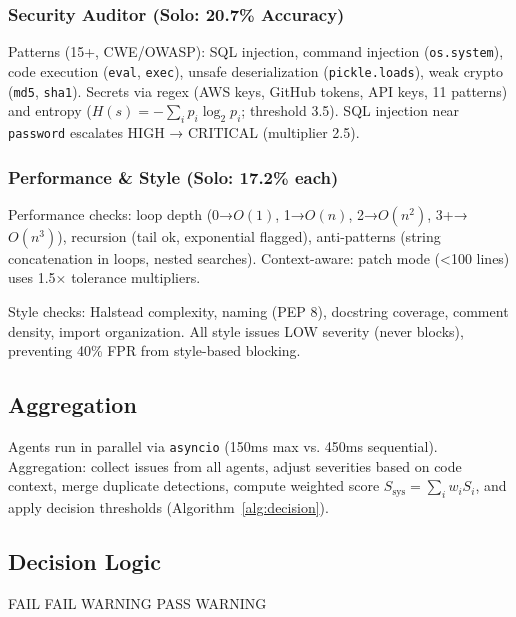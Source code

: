 \documentclass[10pt,twocolumn]{article}
\begin{document}
\subsubsection{Security Auditor (Solo: 20.7\% Accuracy)}

Patterns (15+, CWE/OWASP): SQL injection, command injection (\texttt{os.system}), code execution (\texttt{eval}, \texttt{exec}), unsafe deserialization (\texttt{pickle.loads}), weak crypto (\texttt{md5}, \texttt{sha1}). Secrets via regex (AWS keys, GitHub tokens, API keys, 11 patterns) and entropy ($H(s) = -\sum_i p_i \log_2 p_i$; threshold 3.5). SQL injection near \texttt{password} escalates HIGH → CRITICAL (multiplier 2.5).

\subsubsection{Performance \& Style (Solo: 17.2\% each)}

Performance checks: loop depth (0→$O(1)$, 1→$O(n)$, 2→$O(n^2)$, 3+→$O(n^3)$), recursion (tail ok, exponential flagged), anti-patterns (string concatenation in loops, nested searches). Context-aware: patch mode (<100 lines) uses 1.5$\times$ tolerance multipliers.

Style checks: Halstead complexity, naming (PEP 8), docstring coverage, comment density, import organization. All style issues LOW severity (never blocks), preventing 40\% FPR from style-based blocking.

\subsection{Aggregation}

Agents run in parallel via \texttt{asyncio} (150ms max vs. 450ms sequential). Aggregation: collect issues from all agents, adjust severities based on code context, merge duplicate detections, compute weighted score $S_{\text{sys}} = \sum_i w_i S_i$, and apply decision thresholds (Algorithm~\ref{alg:decision}).

\subsection{Decision Logic}

\begin{algorithm}[t]
\caption{Deployment Decision}
\label{alg:decision}
\begin{algorithmic}[1]
        \State \Return FAIL
        \State \Return FAIL
        \State \Return WARNING
        \State \Return PASS
    \Else
        \State \Return WARNING
    \EndIf
\EndProcedure
\end{algorithmic}
\end{algorithm}
\end{document}
